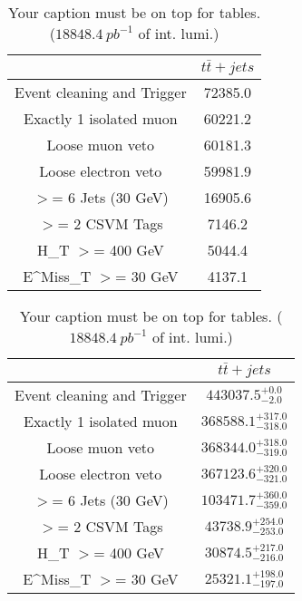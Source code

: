 \documentclass{article}
\begin{document}
\begin{table}
\caption{Your caption must be on top for tables. ($18848.4~pb^{-1}$ of int. lumi.)}
\label{tab:}
\centering
\begin{tabular}{|c|c|}
\toprule
&$t\bar{t}+jets$	\\

\midrule
Event cleaning and Trigger&	72385.0	\\

Exactly 1 isolated muon&	60221.2	\\

Loose muon veto&	60181.3	\\

Loose electron veto&	59981.9	\\

$>$= 6 Jets (30 GeV)&	16905.6	\\

$>$= 2 CSVM Tags&	7146.2	\\

H_{T} $>$=  400 GeV&	5044.4	\\

E^{Miss}_{T} $>$=  30 GeV&	4137.1	\\

\bottomrule
\end{tabular}
\end{table}
\begin{table}
\caption{Your caption must be on top for tables. ($18848.4~pb^{-1}$ of int. lumi.)}
\label{tab:}
\centering
\begin{tabular}{|c|c|}
\toprule
&$t\bar{t}+jets$	\\

\midrule
Event cleaning and Trigger&	$443037.5^{+0.0}_{-2.0}$	\\

Exactly 1 isolated muon&	$368588.1^{+317.0}_{-318.0}$	\\

Loose muon veto&	$368344.0^{+318.0}_{-319.0}$	\\

Loose electron veto&	$367123.6^{+320.0}_{-321.0}$	\\

$>$= 6 Jets (30 GeV)&	$103471.7^{+360.0}_{-359.0}$	\\

$>$= 2 CSVM Tags&	$43738.9^{+254.0}_{-253.0}$	\\

H_{T} $>$=  400 GeV&	$30874.5^{+217.0}_{-216.0}$	\\

E^{Miss}_{T} $>$=  30 GeV&	$25321.1^{+198.0}_{-197.0}$	\\

\bottomrule
\end{tabular}
\end{table}
\end{document}
